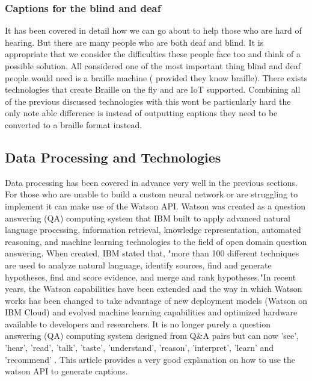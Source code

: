 \documentclass[sigconf]{acmart}
\begin{document}
\subsubsection{Captions for the blind and deaf}
It has been covered in detail how we can go about to help those who are hard of hearing. But there are many people who are both deaf and blind. It is appropriate that we consider the difficulties these people face too and think of a possible solution. All considered one of the most important thing blind and deaf people would need is a braille machine ( provided they know braille). There exists technologies that create Braille on the fly and are IoT supported. Combining all of the previous discussed technologies with this wont be particularly hard the only note able difference is instead of outputting captions they need to be converted to a braille format instead.

\subsection{Data Processing and Technologies}

Data processing has been covered in advance very well in the previous sections. For those who are unable to build a custom neural network or are struggling to implement it can make use of the Watson API. Watson was created as a question answering (QA) computing system that IBM built to apply advanced natural language processing, information retrieval, knowledge representation, automated reasoning, and machine learning technologies to the field of open domain question answering. When created, IBM stated that, "more than 100 different techniques are used to analyze natural language, identify sources, find and generate hypotheses, find and score evidence, and merge and rank hypotheses."In recent years, the Watson capabilities have been extended and the way in which Watson works has been changed to take advantage of new deployment models (Watson on IBM Cloud) and evolved machine learning capabilities and optimized hardware available to developers and researchers. It is no longer purely a question answering (QA) computing system designed from Q\&A pairs but can now 'see', 'hear', 'read', 'talk', 'taste', 'understand', 'reason', 'interpret', 'learn' and 'recommend' \cite{Wkipedia2017ibm} . This article \cite{Massachi2017} provides a very good explanation on how to use the watson API to generate captions.
\end{document}

